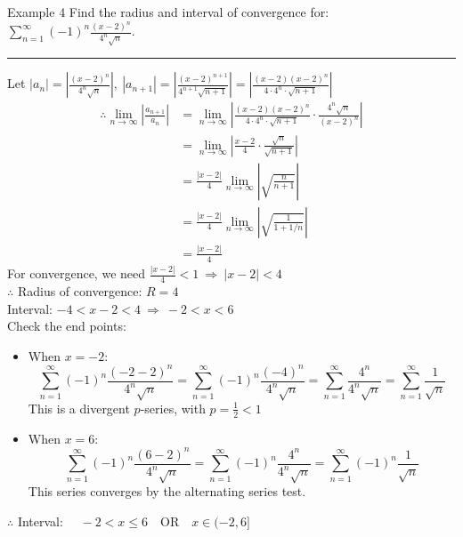 \documentclass[12pt,a4paper]{article}
\begin{document}
\begin{eg}{Example 4}
	Find the radius and interval of convergence for: $\displaystyle\sum^\infty_{n=1}(-1)^n\frac{(x-2)^n}{4^n\sqrt{n}}.$\\
	\noindent\rule[0.25\baselineskip]{\textwidth}{1pt}
	Let $\displaystyle|a_n|=\left|\frac{(x-2)^n}{4^n\sqrt{n}}\right|,\ |a_{n+1}|=\left|\frac{(x-2)^{n+1}}{4^{n+1}\sqrt{n+1}}\right|=\left|\frac{(x-2)(x-2)^n}{4\cdot4^n\cdot\sqrt{n+1}}\right|$
	$$\begin{aligned}
		\therefore\lim_{n\to\infty}\left|\frac{a_{n+1}}{a_n}\right|&=\lim_{n\to\infty}\left|\frac{(x-2)(x-2)^n}{4\cdot4^n\cdot\sqrt{n+1}}\cdot\frac{4^n\sqrt{n}}{(x-2)^n}\right|\\
		&=\lim_{n\to\infty}\left|\frac{x-2}{4}\cdot\frac{\sqrt{n}}{\sqrt{n+1}}\right|\\
		&=\frac{|x-2|}{4}\lim_{n\to\infty}\left|\sqrt{\frac{n}{n+1}}\right|\\
		&=\frac{|x-2|}{4}\lim_{n\to\infty}\left|\sqrt{\frac{1}{1+1/n}}\right|\\
		&=\frac{|x-2|}{4}
	\end{aligned}$$
	For convergence, we need $\displaystyle\frac{|x-2|}{4}<1\ \Rightarrow\ |x-2|<4$\\
	$\therefore$ Radius of convergence: $R=4$\\
	Interval: $-4<x-2<4\ \Rightarrow\ -2<x<6$\\
	Check the end points: 
	\begin{itemize}
		\item When $x=-2$: $$\sum^\infty_{n=1}(-1)^n\frac{(-2-2)^n}{4^n\sqrt{n}}=\sum^\infty_{n=1}(-1)^n\frac{(-4)^n}{4^n\sqrt{n}}=\sum^\infty_{n=1}\frac{4^n}{4^n\sqrt{n}}=\sum^\infty_{n=1}\frac{1}{\sqrt{n}}$$ This is a divergent $p$-series, with $\displaystyle p=\frac{1}{2}<1$
		\item When $x=6$: $$\sum^\infty_{n=1}(-1)^n\frac{(6-2)^n}{4^n\sqrt{n}}=\sum^\infty_{n=1}(-1)^n\frac{4^n}{4^n\sqrt{n}}=\sum^\infty_{n=1}(-1)^n\frac{1}{\sqrt{n}}$$ This series converges by the alternating series test. 
	\end{itemize}
	$\therefore$ Interval: $\quad-2<x\leq6\quad\text{OR}\quad x\in(-2,6]$
\end{eg}
\end{document}
